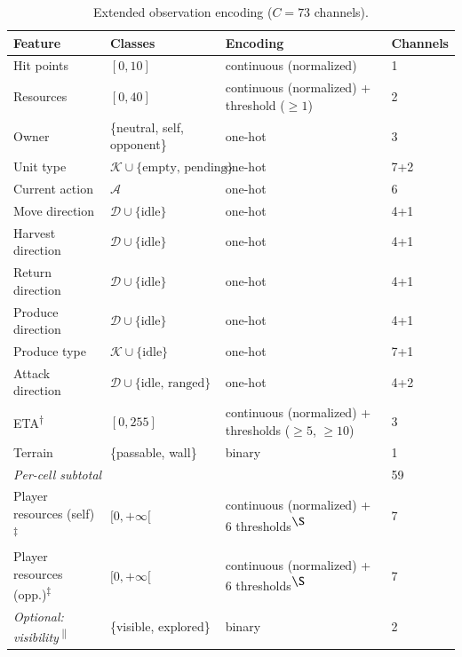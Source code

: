 \begin{table}[!p]
\caption[Extended observation encoding (73 channels)]{Extended observation encoding ($C = 73$ channels).}
\label{tab:extended-obs}
\begin{tabularx}{\textwidth}{p{3.4cm}p{3.5cm}Xp{2cm}}
\toprule
\textbf{Feature} & \textbf{Classes} & \textbf{Encoding} & \textbf{Channels} \\
\midrule
Hit points        & $[0, 10]$                                    & continuous (normalized) & 1 \\
Resources         & $[0, 40]$                                    & continuous (normalized) + threshold ($\geq 1$) & 2 \\
Owner             & \{neutral, self, opponent\}                  & one-hot & 3 \\
Unit type         & $\mathcal{K} \cup \{\text{empty, pending}\}$ & one-hot & 7+2 \\
Current action    & $\mathcal{A}$                                & one-hot & 6 \\
Move direction    & $\mathcal{D} \cup \{\text{idle}\}$           & one-hot & 4+1 \\
Harvest direction & $\mathcal{D} \cup \{\text{idle}\}$           & one-hot & 4+1 \\
Return direction  & $\mathcal{D} \cup \{\text{idle}\}$           & one-hot & 4+1 \\
Produce direction & $\mathcal{D} \cup \{\text{idle}\}$           & one-hot & 4+1 \\
Produce type      & $\mathcal{K} \cup \{\text{idle}\}$           & one-hot & 7+1 \\
Attack direction  & $\mathcal{D} \cup \{\text{idle, ranged}\}$   & one-hot & 4+2 \\
ETA\textsuperscript{$\dagger$}  & $[0, 255]$                            & continuous (normalized) + thresholds ($\geq 5$, $\geq 10$) & 3 \\
Terrain           & \{passable, wall\}                           & binary & 1 \\
\midrule
\multicolumn{3}{l}{\textit{Per-cell subtotal}} & 59 \\
\midrule
Player resources (self)\textsuperscript{$\ddagger$} & $[0, +\infty[$ & continuous (normalized) + 6 thresholds\textsuperscript{$\S$} & 7 \\
Player resources (opp.)\textsuperscript{$\ddagger$} & $[0, +\infty[$ & continuous (normalized) + 6 thresholds\textsuperscript{$\S$} & 7 \\
\midrule
\textit{Optional: visibility}\textsuperscript{$\|$} & \{visible, explored\}     & binary & 2 \\

\end{tabularx}
\end{table}
